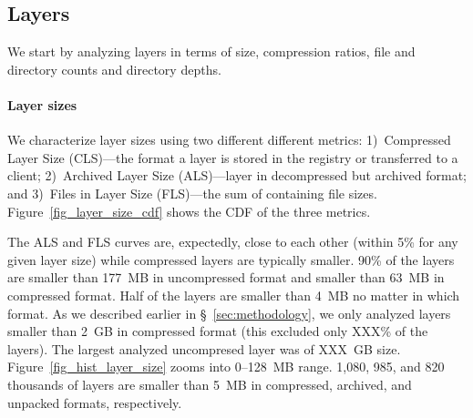 \subsection{Layers}
\label{sec:layers}

We start by analyzing layers in terms of size, compression ratios, file and directory
counts and directory depths.




\paragraph{Layer sizes}
%
We characterize layer sizes using two different different metrics:
%
1)~Compressed Layer Size (CLS)---the format a layer is stored in the registry or
transferred to a client;
%
2)~Archived Layer Size (ALS)---layer in decompressed but archived format;
%
and 3)~Files in Layer Size (FLS)---the sum of containing file sizes.
%
Figure~\ref{fig_layer_size_cdf} shows the CDF of the three metrics.

The ALS and FLS curves are, expectedly, close to each other (within 5\% for
any given layer size) while compressed layers are typically smaller.
90\% of the layers are smaller than 177~MB in uncompressed 
format and smaller than 63~MB in compressed format.
%
Half of the layers are smaller than 4~MB no matter in which format.
%
As we described earlier in \S~\ref{sec:methodology}, we only
analyzed layers smaller than 2~GB in compressed format (this
excluded only XXX\% of the layers).
%
%
The largest analyzed uncompresed layer
was of XXX~GB size.
%
Figure~\ref{fig_hist_layer_size} zooms into 0--128~MB range.
%
1,080, 985, and 820 thousands of layers are smaller than 5~MB
in compressed, archived, and unpacked formats, respectively.
%




